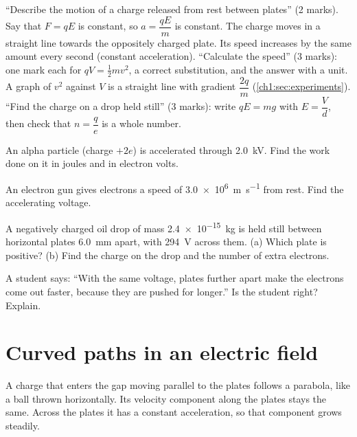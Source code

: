 \begin{examtip}
``Describe the motion of a charge released from rest between plates''
(2 marks). Say that $F = qE$ is constant, so $a = \dfrac{qE}{m}$ is constant.
The charge moves in a straight line towards the oppositely charged plate. Its
speed increases by the same amount every second (constant acceleration).
``Calculate the speed'' (3 marks): one mark each for $qV = \frac{1}{2}mv^2$, a
correct substitution, and the answer with a unit. A graph of $v^2$ against $V$
is a straight line with gradient $\dfrac{2q}{m}$ (\cref{ch1:sec:experiments}).
``Find the charge on a drop held still'' (3 marks): write $qE = mg$ with
$E = \dfrac{V}{d}$, then check that $n = \dfrac{q}{e}$ is a whole number.
\end{examtip}

\begin{quickcheck}
  \item An alpha particle (charge $+2e$) is accelerated through \qty{2.0}{kV}.
        Find the work done on it in joules and in electron volts.
  \item An electron gun gives electrons a speed of \qty{3.0e6}{m.s^{-1}} from
        rest. Find the accelerating voltage.
  \item A negatively charged oil drop of mass \qty{2.4e-15}{kg} is held still
        between horizontal plates \qty{6.0}{mm} apart, with \qty{294}{V} across
        them. (a) Which plate is positive? (b) Find the charge on the drop and
        the number of extra electrons.
  \item A student says: ``With the same voltage, plates further apart make the
        electrons come out faster, because they are pushed for longer.'' Is the
        student right? Explain.
\end{quickcheck}

\section{Curved paths in an electric field}\label{ch1:sec:paths}

\begin{bigidea}
A charge that enters the gap moving parallel to the plates follows a parabola,
like a ball thrown horizontally. Its velocity component along the plates stays
the same. Across the plates it has a constant acceleration, so that component
grows steadily.
\end{bigidea}

